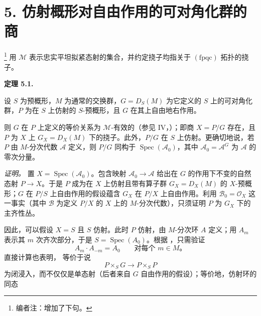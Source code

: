 
\setcounter{footnote}{16}

\section*{5. 仿射概形对自由作用的可对角化群的商}

\noindent\footnote{编者注：增加了下句。}
用 \(\mathcal M\) 表示忠实平坦拟紧态射的集合，并约定挠子均指关于 \((\mathrm{fpqc})\) 拓扑的挠子。

\medskip
\noindent{}\textbf{定理 5.1.}
\begin{itshape}
设 \(S\) 为预概形，\(M\) 为通常的交换群，\(G=D_S(M)\) 为它定义的 \(S\) 上的可对角化群，\(P\) 为在 \(S\) 上仿射的 \(S\)-预概形，且 \(G\) 在其上自由地右作用。

则 \(G\) 在 \(P\) 上定义的等价关系为 \(\mathcal M\)-有效的（参见 IV，）；即商 \(X=P/G\) 存在，且 \(P\) 为 \(X\) 上 \(G_X=D_X(M)\) 下的挠子。此外，\(P/G\) 在 \(S\) 上仿射。更确切地说，若 \(P\) 由 \(M\)-分次代数 \(\mathcal A\) 定义，则 \(P/G\) 同构于 \(\operatorname{Spec}(\mathcal A_0)\)，其中 \(\mathcal A_0=\mathcal A^G\) 为 \(\mathcal A\) 的零次分量。
\end{itshape}

\smallskip
\noindent\textit{证明。}
置 \(X=\operatorname{Spec}(\mathcal A_0)\)。包含映射 \(\mathcal A_0\to\mathcal A\) 给出在 \(G\) 的作用下不变的自然态射 \(P\to X\)。于是 \(P\) 成为在 \(X\) 上仿射且带有算子群 \(G_X=D_X(M)\) 的 \(X\)-预概形；\(G\) 在 \(P/S\) 上自由作用的假设蕴含 \(G_X\) 在 \(P/X\) 上自由作用。利用 \(\mathcal B_0=\mathcal O_X\) 这一事实（其中 \(\mathcal B\) 为定义 \(P/X\) 的 \(X\) 上的 \(M\)-分次代数），只须证明 \(P\) 为 \(G_X\) 下的主齐性丛。

因此，可以假设 \(X=S\) 且 \(S\) 仿射。此时 \(P\) 仿射，由 \(M\)-分次环 \(A\) 定义；用 \(A_m\) 表示其 \(m\) 次齐次部分，于是 \(S=\operatorname{Spec}(A_0)\)。根据 ，只需验证
\[
  A_m\cdot A_{-m}=A_0
  \qquad\text{对每个 \(m\in M\)。}
  \tag{x}\label{sga3:viii:theorem:5:1:eq:x:01}
\]
直接计算也表明， 等价于说
\[
  P\times_SG\longrightarrow P\times_SP
\]
为闭浸入，而不仅仅是单态射（后者来自 \(G\) 自由作用的假设）；等价地，仿射环的同态


